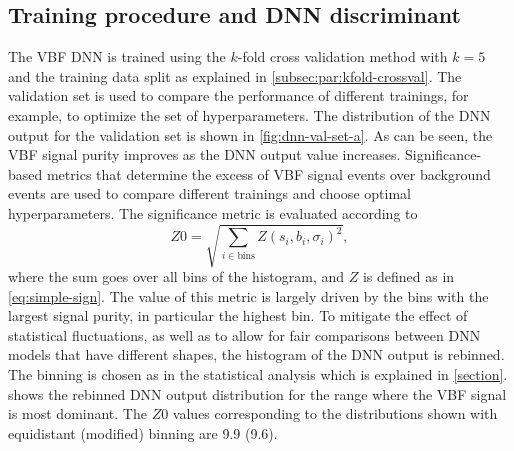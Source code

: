 \subsection{Training procedure and DNN discriminant}
\label{subsec:performance-metrics}
The VBF DNN is trained using the $k$-fold cross validation method with $k=5$ and the training data split as explained in \cref{subsec:par:kfold-crossval}.
The validation set is used to compare the performance of different trainings, for example, to optimize the set of hyperparameters.
The distribution of the DNN output for the validation set is shown in \cref{fig:dnn-val-set-a}.
As can be seen, the VBF signal purity improves as the DNN output value increases.
Significance-based metrics that determine the excess of VBF signal events over background events are used to compare different trainings and choose optimal hyperparameters.
The significance metric is evaluated according to
\begin{equation}
    \label{eq:significance-performance-metric}
    Z0 = \sqrt{ \sum_{i \in \text{bins}} Z(s_{i}, b_{i}, \sigma_{i})^2 },
\end{equation}
where the sum goes over all bins of the histogram, and $Z$ is defined as in \cref{eq:simple-sign}.
The value of this metric is largely driven by the bins with the largest signal purity, in particular the highest bin.
To mitigate the effect of statistical fluctuations, as well as to allow for fair comparisons between DNN models that have different shapes, the histogram of the DNN output is rebinned. The binning is chosen as in the statistical analysis which is explained in \cref{section}.  shows the rebinned DNN output distribution for the range where the VBF signal is most dominant. The $Z0$ values corresponding to the distributions shown with equidistant (modified) binning are 9.9 (9.6). 



